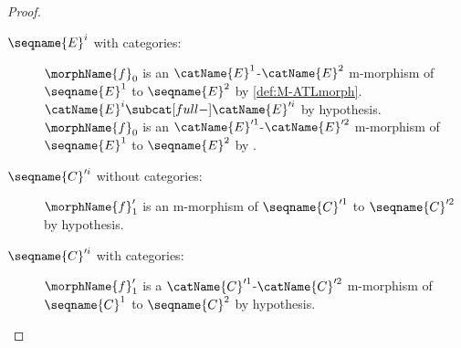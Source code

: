 \documentclass{article}
\begin{document}
\begin{lemma}
\begin{enumerate}
\begin{proof}
\begin{description}
\item[$\seqname{E}^i$ with categories:]
$\morphName{f}_0$ is an $\catName{E}^1$-$\catName{E}^2$
m-morphism of $\seqname{E}^1$ to $\seqname{E}^2$ by
\cref{def:M-ATLmorph}.
$\catName{E}^i \subcat[full-] \catName{E}'^i$ by hypothesis.
$\morphName{f}_0$ is an $\catName{E}'^1$-$\catName{E}'^2$
m-morphism of $\seqname{E}^1$ to $\seqname{E}^2$ by
.

\item[$\seqname{C}'^i$ without categories:]
$\morphName{f}'_1$ is an m-morphism of $\seqname{C}'^1$ to
$\seqname{C}'^2$ by hypothesis.

\item[$\seqname{C}'^i$ with categories:]
$\morphName{f}'_1$ is a $\catName{C}'^1$-$\catName{C}'^2$
m-morphism of $\seqname{C}^1$ to $\seqname{C}^2$ by hypothesis.
\end{description}
\end{proof}
\end{enumerate}
\end{lemma}
\end{document}
